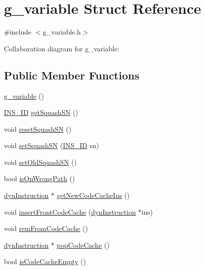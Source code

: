 \hypertarget{structg__variable}{
\section{g\_\-variable Struct Reference}
\label{structg__variable}
}


{\ttfamily \#include $<$g\_\-variable.h$>$}



Collaboration diagram for g\_\-variable:
\subsection*{Public Member Functions}
\begin{DoxyCompactItemize}
\item 
\hyperlink{structg__variable_a0b12751ab1f92b2345771c45290fc19e}{g\_\-variable} ()
\item 
\hyperlink{global_2global_8h_a1883c47d0023d0f200e1d86eced6a070}{INS\_\-ID} \hyperlink{structg__variable_a366fb213b96fa81e166dbe60a16c3e4f}{getSquashSN} ()
\item 
void \hyperlink{structg__variable_a0031c2dbd6463bf57b4d24335eb7b9ca}{resetSquashSN} ()
\item 
void \hyperlink{structg__variable_a3bbe6f8c101d665e05c30ef1eb7c9a16}{setSquashSN} (\hyperlink{global_2global_8h_a1883c47d0023d0f200e1d86eced6a070}{INS\_\-ID} sn)
\item 
void \hyperlink{structg__variable_adc6b682b4875fa3af7d390099c93dc88}{setOldSquashSN} ()
\item 
bool \hyperlink{structg__variable_afb2439358b8c746fc28eaadb0ac77b10}{isOnWrongPath} ()
\item 
\hyperlink{classdynInstruction}{dynInstruction} $\ast$ \hyperlink{structg__variable_a8ba648162a8abae37194625703d094c9}{getNewCodeCacheIns} ()
\item 
void \hyperlink{structg__variable_ac6cd30370c34c5a0862aa9a4c56049db}{insertFrontCodeCache} (\hyperlink{classdynInstruction}{dynInstruction} $\ast$ins)
\item 
void \hyperlink{structg__variable_ab351194ce2a3de088813ae861c7e3d10}{remFromCodeCache} ()
\item 
\hyperlink{classdynInstruction}{dynInstruction} $\ast$ \hyperlink{structg__variable_abb078ae60bb65db485a0cc2382bd4457}{popCodeCache} ()
\item 
bool \hyperlink{structg__variable_a4b5f6627f388c34df7af5168a119778d}{isCodeCacheEmpty} ()
\end{DoxyCompactItemize}
